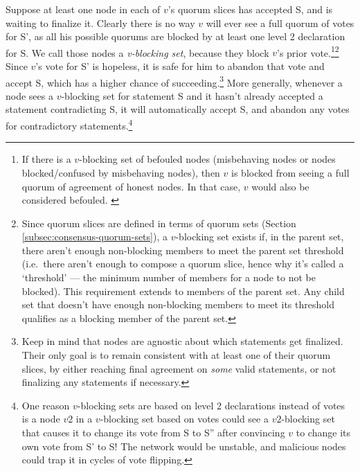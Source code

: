 Suppose at least one node in each of $v$'s quorum slices has accepted S, and is waiting to finalize it. Clearly there is no way $v$ will ever see a full quorum of votes for S', as all his possible quorums are blocked by at least one level 2 declaration for S. We call those nodes a {\em v-blocking set}, because they block $v$'s prior vote.\footnote{If there is a $v$-blocking set of befouled nodes (misbehaving nodes or nodes blocked/confused by misbehaving nodes), then $v$ is blocked from seeing a full quorum of agreement of honest nodes. In that case, $v$ would also be considered befouled. \cite{stellar-consensus-protocol}}\footnote{\label{footnote:v-blocking-quorum-sets}Since quorum slices are defined in terms of quorum sets (Section \ref{subsec:consensus-quorum-sets}), a $v$-blocking set exists if, in the parent set, there aren't enough non-blocking members to meet the parent set threshold (i.e.\ there aren't enough to compose a quorum slice, hence why it's called a `threshold' --- the minimum number of members for a node to not be blocked). This requirement extends to members of the parent set. Any child set that doesn't have enough non-blocking members to meet its threshold qualifies as a blocking member of the parent set.} Since $v$'s vote for S' is hopeless, it is safe for him to abandon that vote and accept S, which has a higher chance of succeeding.\footnote{Keep in mind that nodes are agnostic about which statements get finalized. Their only goal is to remain consistent with at least one of their quorum slices, by either reaching final agreement on {\em some} valid statements, or not finalizing any statements if necessary.} More generally, whenever a node sees a $v$-blocking set for statement S and it hasn't already accepted a statement contradicting S, it will automatically accept S, and abandon any votes for contradictory statements.\footnote{One reason $v$-blocking sets are based on level 2 declarations instead of votes is a node $v2$ in a $v$-blocking set based on votes could see a $v2$-blocking set that causes it to change its vote from S to S'' after convincing $v$ to change its own vote from S' to S! The network would be unstable, and malicious nodes could trap it in cycles of vote flipping.}

